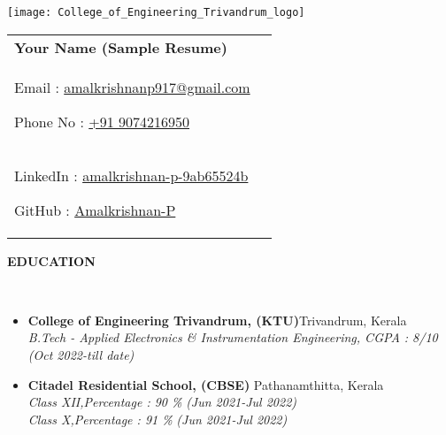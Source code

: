 \documentclass[a4paper,10pt]{article}
\newcommand{\resheading}[1]{{\small \colorbox{mygrey}{\begin{minipage}{0.99\textwidth}{\textbf{#1 \vphantom{p\^{E}}}}\end{minipage}}}}
\begin{document}
\begin{table}
    \begin{minipage}{0.15\linewidth}
        \centering
        \texttt{[image: College\_of\_Engineering\_Trivandrum\_logo]}
    \end{minipage}
    \begin{minipage}{0.1\linewidth}
        \setlength{\tabcolsep}{10pt}
        \def\arraystretch{1.4}
        \begin{tabular}{ll}
            \textbf{\huge{Your Name (Sample Resume)}}   \\
            
            {Email : }\href{https://www.linkedin.com/in/amalkrishnan-p-9ab65524b/?}{amalkrishnanp917@gmail.com} \hspace{4.5cm}
            
            {Phone No : }\href{tel:9074216950}{+91 9074216950}& \hspace{.1 cm}\\
            
            {LinkedIn : }\href{https://www.linkedin.com/in/amalkrishnan-p-9ab65524b/?}{amalkrishnan-p-9ab65524b}\hspace{4.65cm}
            
            {GitHub : }\href{https://github.com/Amalkrishnan-P}{Amalkrishnan-P}\\
            
        \end{tabular}
    \end{minipage}\hfill
    \vspace{-0.6cm}
\end{table}




\noindent
\resheading{{ EDUCATION}}\\[-0.4cm]

\begin{itemize}

\item \textbf{College of Engineering Trivandrum, (KTU)}\hfill{Trivandrum, Kerala}\\
\emph{B.Tech - Applied Electronics \& Instrumentation Engineering, \hspace{.1cm}CGPA : 8/10} \hfill \emph{(Oct 2022-till date)}

\item \textbf{Citadel Residential School, (CBSE) }\hfill{Pathanamthitta, Kerala} \\
\emph{Class XII,\hspace{.1cm}Percentage : 90 \%} \hfill \emph{(Jun 2021-Jul 2022)}\\
\emph{Class X,\hspace{.33cm}Percentage  : 91 \% } \hfill \emph{(Jun 2021-Jul 2022)}
    \vspace{-0.2cm}
\end{itemize}
\end{document}
